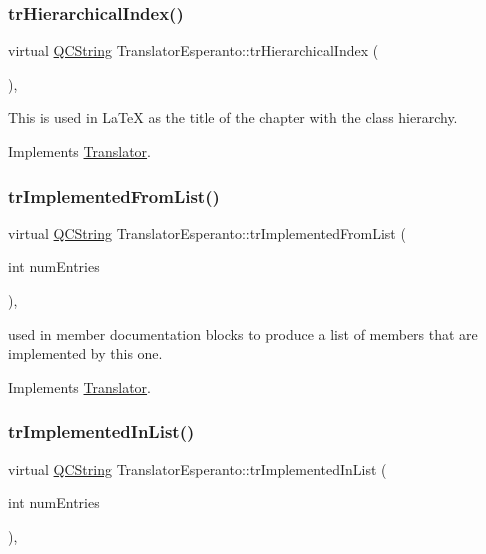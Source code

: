 \subsubsection{\texorpdfstring{trHierarchicalIndex()}{trHierarchicalIndex()}}
{\footnotesize\ttfamily virtual \mbox{\hyperlink{class_q_c_string}{Q\+C\+String}} Translator\+Esperanto\+::tr\+Hierarchical\+Index (\begin{DoxyParamCaption}{ }\end{DoxyParamCaption})\hspace{0.3cm}{\ttfamily [inline]}, {\ttfamily [virtual]}}

This is used in La\+TeX as the title of the chapter with the class hierarchy. 

Implements \mbox{\hyperlink{class_translator}{Translator}}.

\mbox{\label{class_translator_esperanto_ac3b1faab05e25b5d0f73f33ae471a0e4}} 
\subsubsection{\texorpdfstring{trImplementedFromList()}{trImplementedFromList()}}
{\footnotesize\ttfamily virtual \mbox{\hyperlink{class_q_c_string}{Q\+C\+String}} Translator\+Esperanto\+::tr\+Implemented\+From\+List (\begin{DoxyParamCaption}\item[{int}]{num\+Entries }\end{DoxyParamCaption})\hspace{0.3cm}{\ttfamily [inline]}, {\ttfamily [virtual]}}

used in member documentation blocks to produce a list of members that are implemented by this one. 

Implements \mbox{\hyperlink{class_translator}{Translator}}.

\mbox{\label{class_translator_esperanto_a08455b98b0573a17c8866e2ef41d0c6f}} 
\subsubsection{\texorpdfstring{trImplementedInList()}{trImplementedInList()}}
{\footnotesize\ttfamily virtual \mbox{\hyperlink{class_q_c_string}{Q\+C\+String}} Translator\+Esperanto\+::tr\+Implemented\+In\+List (\begin{DoxyParamCaption}\item[{int}]{num\+Entries }\end{DoxyParamCaption})\hspace{0.3cm}{\ttfamily [inline]}, {\ttfamily [virtual]}}

